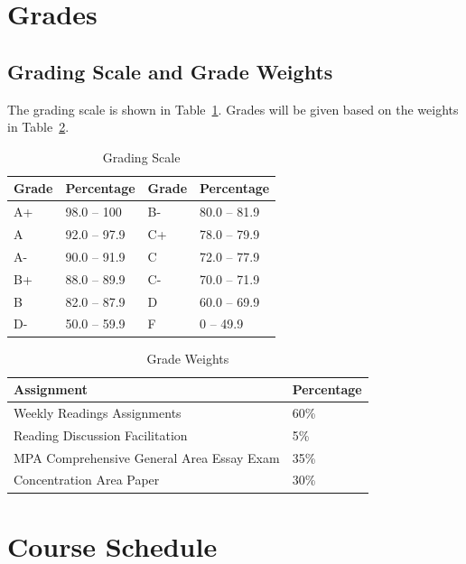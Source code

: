 \documentclass[12pt, letterpaper]{article}
\begin{document}
\section{Grades}


\subsection*{Grading Scale and Grade Weights}  

The grading scale is shown in Table~\ref{tab:grading-scale}. Grades will be given based on the weights in Table~\ref{tab:grade-weights}.

\begin{table}[h]
\centering
\caption{Grading Scale}
\begin{tabular}{llll}
\toprule
\textbf{Grade} & \textbf{Percentage} & \textbf{Grade} & \textbf{Percentage} \\
\midrule
A+ & 98.0 -- 100 & B- & 80.0 -- 81.9\\
A & 92.0 -- 97.9 & C+ & 78.0 -- 79.9\\
A- & 90.0 -- 91.9 & C & 72.0 -- 77.9\\
B+ & 88.0 -- 89.9 & C- & 70.0 -- 71.9\\
B & 82.0 -- 87.9 & D & 60.0 -- 69.9\\
D- & 50.0 -- 59.9 & F & 0 -- 49.9\\

\bottomrule
\end{tabular}
\label{tab:grading-scale}
\end{table}

\begin{table}[h!]
    \centering
    \caption{Grade Weights}
    \begin{tabular}{ll}
        \toprule
    \textbf{Assignment} & \textbf{Percentage} \\
    \midrule
    Weekly Readings Assignments & 60\% \\
    Reading Discussion Facilitation & 5\% \\
    MPA Comprehensive General Area Essay Exam & 35\% \\
    Concentration Area Paper & 30\% \\
    \bottomrule
    \end{tabular}
    \label{tab:grade-weights}
    \end{table}
    
\section{Course Schedule}
\end{document}
